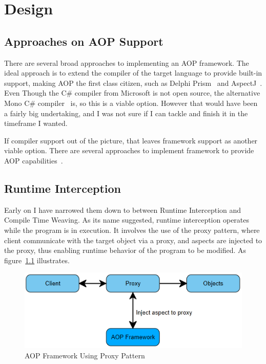 \chapter{Design}

\section{Approaches on AOP Support}

There are several broad approaches to implementing an AOP framework. The ideal approach is to extend the compiler of the target language to provide built-in support, making AOP the first class citizen, such as Delphi Prism~\cite{delphi_prism2010} and AspectJ~\cite{aspectj_faq, aspectj_text}. Even Though the C\# compiler from Microsoft is not open source, the alternative Mono C\# compiler~\cite{monocsharp} is, so this is a viable option. However that would have been a fairly big undertaking, and I was not sure if I can tackle and finish it in the timeframe I wanted.

If compiler support out of the picture, that leaves framework support as another viable option. There are several approaches to implement framework to provide AOP capabilities~\cite{aopcs, postsharp, aspectcs}.

\section{Runtime Interception}

Early on I have narrowed them down to between Runtime Interception and Compile Time Weaving. As its name suggested, runtime interception operates while the program is in execution. It involves the use of the proxy pattern, where client communicate with the target object via a proxy, and aspects are injected to the proxy, thus enabling runtime behavior of the program to be modified. As figure~\ref{proxy_model} illustrates.

\begin{figure}[H]
  \includegraphics[scale=1.0]{Proxy.PNG}
  \centering
  \caption{AOP Framework Using Proxy Pattern\label{proxy_model}}
\end{figure}

